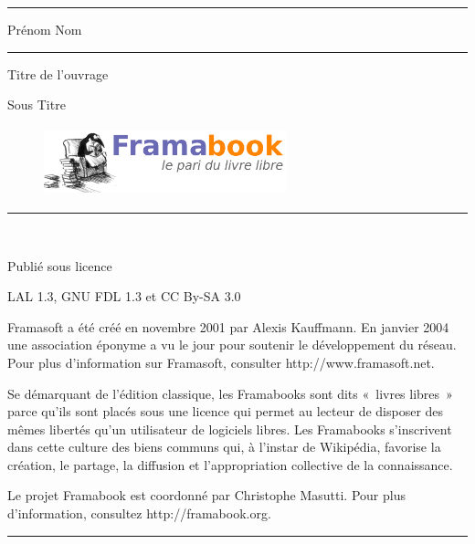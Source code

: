 \documentclass{framatexclass}
\begin{document}
\frontmatter                        
            
\begin{titlepage}
\noindent\rule{\linewidth}{1pt}
\begin{center}\LARGE{Prénom Nom}\end{center}
\noindent\rule{\linewidth}{1pt}
\begin{center}\Huge{Titre de l'ouvrage}\end{center}
\begin{center}\LARGE{Sous Titre}\end{center}
\begin{center}

\begin{figure}[!ht]
\begin{center}  \includegraphics[width=70mm,height=20mm]{images/Logo_framabook_grand.png}  \end{center}
\end{figure}

\end{center}
\begin{center}
\noindent\rule{\linewidth/2}{1pt} \\
\end{center}
\begin{center}Publié sous licence\end{center}
\begin{center}LAL 1.3, GNU FDL 1.3 et CC By-SA 3.0\end{center}
\newpage 
\begin{flushleft}Framasoft a été créé en novembre 2001 par Alexis Kauffmann. En janvier 2004 une association éponyme a vu le jour pour soutenir le développement du réseau. Pour plus d’information sur Framasoft, consulter http://www.framasoft.net.\end{flushleft}
\begin{flushleft}Se démarquant de l’édition classique, les Framabooks sont dits «~livres libres~» parce qu’ils sont placés sous une licence qui permet au lecteur de disposer des mêmes libertés qu’un utilisateur de logiciels libres. Les Framabooks s’inscrivent dans cette culture des biens communs qui, à l’instar de Wikipédia, favorise la création, le partage, la diffusion et l’appropriation collective de la connaissance.\end{flushleft}
\begin{flushleft}Le projet Framabook est coordonné par Christophe Masutti. Pour plus d’information, consultez http://framabook.org.\end{flushleft}
\begin{center}\rule{100mm}{1pt}\end{center}\bigskip{}


\end{titlepage}
\end{document}

